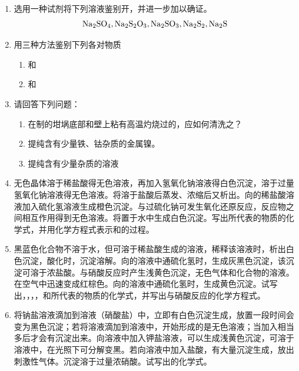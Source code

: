 \begin{enumerate}[label=\arabic*., start=1, itemsep=1.5ex]
    \item 选用一种试剂将下列溶液鉴别开，并进一步加以确证。
    \[
    \ce{Na2SO4}, \ce{Na2S2O3}, \ce{Na2SO3}, \ce{Na2S2}, \ce{Na2S}
    \]
    \item 用三种方法鉴别下列各对物质
    \begin{enumerate}[label=(\arabic*), itemsep=1ex]
        \item {}和
        \item {}和
    \end{enumerate}
    \item 请回答下列问题：
    \begin{enumerate}[label=(\arabic*), itemsep=1ex]
        \item 在制的坩埚底部和壁上粘有高温灼烧过的，应如何清洗之？
        \item 提纯含有少量铁、钴杂质的金属镍。
        \item 提纯含有少量杂质的溶液
    \end{enumerate}
    \item 无色晶体溶于稀盐酸得无色溶液，再加入氢氧化钠溶液得白色沉淀，溶于过量氢氧化钠溶液得无色溶液。将溶于盐酸后蒸发、浓缩后又析出。向的稀盐酸溶液加入硫化氢溶液生成橙色沉淀。与过硫化钠可发生氧化还原反应，反应物之间相互作用得到无色溶液。将置于水中生成白色沉淀。写出所代表的物质的化学式，并用化学方程式表示和的过程。
    \item 黑蓝色化合物不溶于水，但可溶于稀盐酸生成的溶液，稀释该溶液时，析出白色沉淀，酸化时，沉淀溶解。向的溶液中通硫化氢时，生成灰黑色沉淀，该沉淀可溶于浓盐酸。与硝酸反应时产生浅黄色沉淀，无色气体和化合物的溶液。在空气中迅速变成红棕色。向的溶液中通硫化氢时，生成黄色沉淀。试写出，，，，和所代表的物质的化学式，并写出与硝酸反应的化学方程式。
    \item 将钠盐溶液滴加到溶液（硝酸盐）中，立即有白色沉淀生成，放置一段时间会变为黑色沉淀；若将溶液滴加到溶液中，开始形成的是无色溶液；当加入相当多后才会有沉淀出来。向溶液中加入钾盐溶液，可以生成浅黄色沉淀，可溶于溶液中，在光照下可分解变黑。若向溶液中加入盐酸，有大量沉淀生成，放出刺激性气体。沉淀溶于过量浓硝酸。试写出的化学式。
\end{enumerate}







